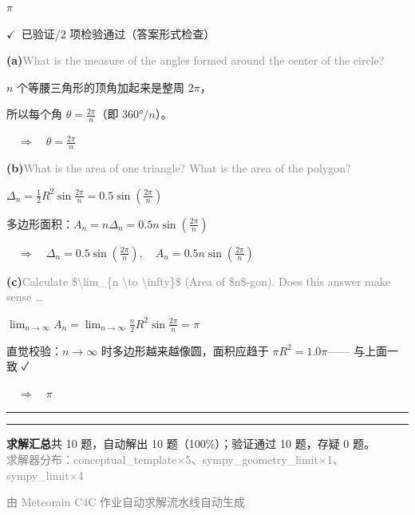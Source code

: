 \documentclass[12pt, a4paper]{article}
\newcommand{\verifyok}{\textcolor{solutiongreen}{\ensuremath{\checkmark}\ 已验证}}
\begin{document}
\begin{center}
$\boxed{\pi}$
\end{center}

\begin{verifybox}\small \verifyok{}/2 项检验通过（答案形式检查） \end{verifybox}

\vspace{0.3em}
\textbf{(a)}\quad \textcolor{gray}{\small What is the measure of the angles formed around the center of the circle?}

$n$ 个等腰三角形的顶角加起来是整周 $2\pi$，

所以每个角 $\theta = \frac{2\pi}{n}$（即 $360°/n$）。

$\quad\Rightarrow\quad \theta = \frac{2\pi}{n}$

\textbf{(b)}\quad \textcolor{gray}{\small What is the area of one triangle? What is the area of the polygon?}

$\Delta_n = \frac{1}{2}R^2\sin\frac{2\pi}{n} = 0.5 \sin{\left(\frac{2 \pi}{n} \right)}$

多边形面积：$A_n = n\Delta_n = 0.5 n \sin{\left(\frac{2 \pi}{n} \right)}$

$\quad\Rightarrow\quad \Delta_n = 0.5 \sin{\left(\frac{2 \pi}{n} \right)},\quad A_n = 0.5 n \sin{\left(\frac{2 \pi}{n} \right)}$

\textbf{(c)}\quad \textcolor{gray}{\small Calculate \$\textbackslash{}lim\_\{n \textbackslash{}to \textbackslash{}infty\}\$ (Area of \$n\$-gon). Does this answer make sense …}

$\lim_{n \to \infty} A_n = \lim_{n\to\infty} \frac{n}{2}R^2\sin\frac{2\pi}{n} = \pi$

直觉校验：$n\to\infty$ 时多边形越来越像圆，面积应趋于 $\pi R^2 = 1.0 \pi$—— 与上面一致 ✓

$\quad\Rightarrow\quad \pi$


\vspace{0.8em}\hrule\vspace{0.8em}

\vspace{1.5em}
\hrule\vspace{0.8em}
\begin{center}\small
\textbf{求解汇总}\quad 共 10 题，自动解出 10 题（100\%）；验证通过 10 题，存疑 0 题。\\[0.3em]
\textcolor{gray}{求解器分布：conceptual\_template×5、sympy\_geometry\_limit×1、sympy\_limit×4}
\end{center}
\vfill\begin{center}\footnotesize\textcolor{gray}{由 Meteorain C4C 作业自动求解流水线自动生成}\end{center}
\end{document}
